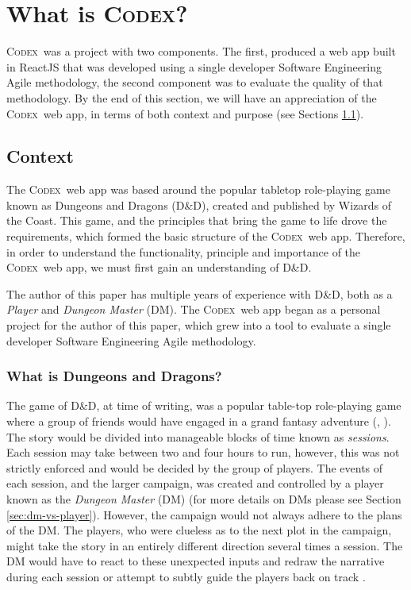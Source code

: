 \documentclass[final]{cmpreport}
\newcommand{\WotC}{Wizards of the Coast}
\newcommand{\dnd}{D\&D}
\newcommand{\Codex}{\textsc{Codex}}
\begin{document}
	\section{What is \Codex?} \label{sec:what-codex}
	\Codex \ was a project with two components. The first, produced a web app built in ReactJS that was developed using a single developer Software Engineering Agile methodology, the second component was to evaluate the quality of that methodology. By the end of this section, we will have an appreciation of the \Codex \ web app, in terms of both context and purpose (see Sections \ref{sec:context}).
	
		\subsection{Context} \label{sec:context}
		The \Codex \ web app was based around the popular tabletop role-playing game known as Dungeons and Dragons (\dnd), created and published by \WotC. This game, and the principles that bring the game to life drove the requirements, which formed the basic structure of the \Codex \ web app. Therefore, in order to understand the functionality, principle and importance of the \Codex \ web app, we must first gain an understanding of \dnd. 
		
		The author of this paper has multiple years of experience with \dnd, both as a \emph{Player} and \emph{Dungeon Master} (DM). The \Codex \ web app began as a personal project for the author of this paper, which grew into a tool to evaluate a single developer Software Engineering Agile methodology. 
		
			\subsubsection{What is Dungeons and Dragons?} \label{sec:what-dnd}
			The game of \dnd, at time of writing, was a popular table-top role-playing game where a group of friends would have engaged in a grand fantasy adventure (\cite{DnDOriginal}, \cite{DnDHistory}). The story would be divided into manageable blocks of time known as \emph{sessions}. Each session may take between two and four hours to run, however, this was not strictly enforced and would be decided by the group of players. The events of each session, and the larger campaign, was created and controlled by a player known as the \emph{Dungeon Master} (DM) (for more details on DMs please see Section \ref{sec:dm-vs-player}). However, the campaign would not always adhere to the plans of the DM. The players, who were clueless as to the next plot in the campaign, might take the story in an entirely different direction several times a session. The DM would have to react to these unexpected inputs and redraw the narrative during each session or attempt to subtly guide the players back on track \citep{PlayerHandbook}. 
			
\end{document}
